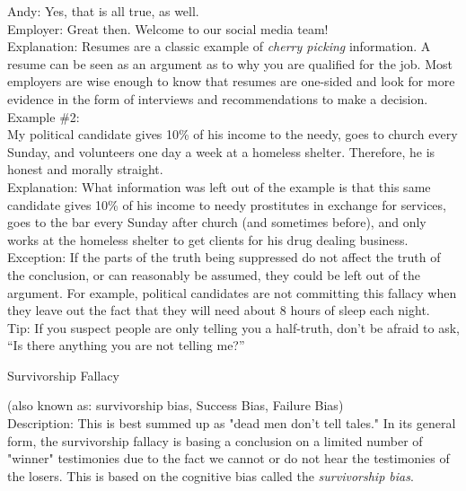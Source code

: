 \documentclass[a4paper,12pt,single,pdftex]{scrartcl}
\begin{document}
{    
      Andy: Yes, that is all true, as well.
    \\

    
      Employer: Great then.  Welcome to our social media team!
    \\

    
      Explanation: Resumes are a classic example of {\it cherry picking}  information.  A resume can be seen as an argument as to why you are qualified for the job.  Most employers are wise enough to know that resumes are one-sided and look for more evidence in the form of interviews and recommendations to make a decision.
    \\

    
      Example \#2:
    \\

    
      My political candidate gives 10\% of his income to the needy, goes to church every Sunday, and volunteers one day a week at a homeless shelter.  Therefore, he is honest and morally straight.
    \\

    
      Explanation: What information was left out of the example is that this same candidate gives 10\% of his income to needy prostitutes in exchange for services, goes to the bar every Sunday after church (and sometimes before), and only works at the homeless shelter to get clients for his drug dealing business.
    \\

    
      Exception: If the parts of the truth being suppressed do not affect the truth of the conclusion, or can reasonably be assumed, they could be left out of the argument.  For example, political candidates are not committing this fallacy when they leave out the fact that they will need about 8 hours of sleep each night.
    \\

    
      Tip: If you suspect people are only telling you a half-truth, don’t be afraid to ask, “Is there anything you are not telling me?”
    \\

  }


Survivorship Fallacy
    
      (also known as: survivorship bias, Success Bias, Failure Bias)
    \\

  
    Description: This is best summed up as "dead men don't tell tales." In its general form, the survivorship fallacy is basing a conclusion on a limited number of "winner" testimonies due to the fact we cannot or do not hear the testimonies of the losers. This is based on the cognitive bias called the {\it survivorship bias}.
\end{document}
